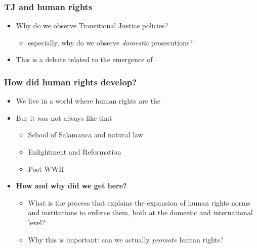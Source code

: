 \documentclass[aspectratio=43]{beamer}
\begin{document}
\begin{frame}
\frametitle{TJ and human rights}
\centering

\begin{itemize}
  \item Why do we observe Transitional Justice policies?
  \begin{itemize}
    \item especially, why do we observe \textit{domestic} prosecutions?
  \end{itemize}
  \item This is a debate related to the emergence of 
\end{itemize}

\end{frame}

\begin{frame}
\frametitle{How did human rights develop?}
\centering

\begin{itemize}
  \item We live in a world where human rights are the 
  \item<2-> But it was not always like that
  \begin{itemize}
    \item<3-> School of Salamanca and natural law
    \item<4-> Enlightment and Reformation
    \item<5-> Post-WWII
  \end{itemize}
  \item<6-> \textbf{How and why did we get here?}
  \begin{itemize}
    \item What is the process that explains the expansion of human rights norms and institutions to enforce them, both at the domestic and international level?
    \item<6-> Why this is important: can we actually \textit{promote} human rights?
  \end{itemize}
\end{itemize}


\end{frame}
\end{document}
